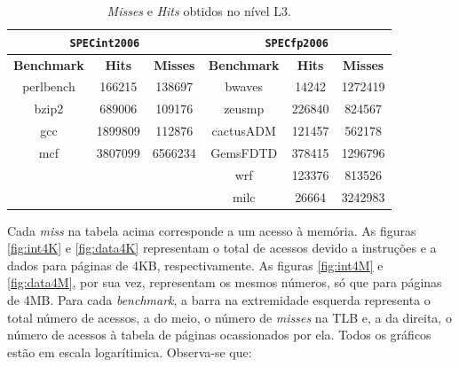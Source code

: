 \documentclass[12pt]{article}
\begin{document}
\begin{table}[h]
    \centering
	\caption{\label{tabela:l123s} \textit{Misses} e \textit{Hits} obtidos no
	nível L3.}
	\begin{tabular}{| c | c | c | c | c | c |}
		\hline
		\multicolumn{3}{|c|}{ \texttt{SPECint2006}} & \multicolumn{3}{|c|}{
		\texttt{SPECfp2006}} \\ \hline \textbf{Benchmark} & \textbf{Hits} &
		\textbf{Misses} & \textbf{Benchmark} & \textbf{Hits} &
		\textbf{Misses} \\ \hline
		
		perlbench & 166215 & 138697 & bwaves & 14242 & 1272419  \\ \hline
		bzip2 & 689006 & 109176 &  zeusmp & 226840 & 824567  \\ \hline
		gcc & 1899809 & 112876 & cactusADM  & 121457 & 562178  \\ \hline
		mcf & 3807099 & 6566234  & GemsFDTD & 378415 & 1296796 \\ \hline
		& & & wrf & 123376 & 813526  \\ \hline
		& & & milc & 26664 & 3242983  \\ \hline
		
		\hline
	\end{tabular}	    
\end{table}

Cada \textit{miss} na tabela acima corresponde a um acesso à memória. As
figuras \ref{fig:int4K} e \ref{fig:data4K} representam o total de
acessos devido a instruções e a dados para páginas de 4KB, respectivamente. As
figuras \ref{fig:int4M} e \ref{fig:data4M}, por sua vez, representam os mesmos
números, só que para páginas de 4MB. Para cada \textit{benchmark}, a
barra na extremidade esquerda representa o total número de acessos, a
do meio, o número de \textit{misses} na TLB e, a da direita, o número
de acessos à tabela de páginas ocassionados por ela. Todos os gráficos
estão em escala logarítimica. Observa-se que:
\end{document}
